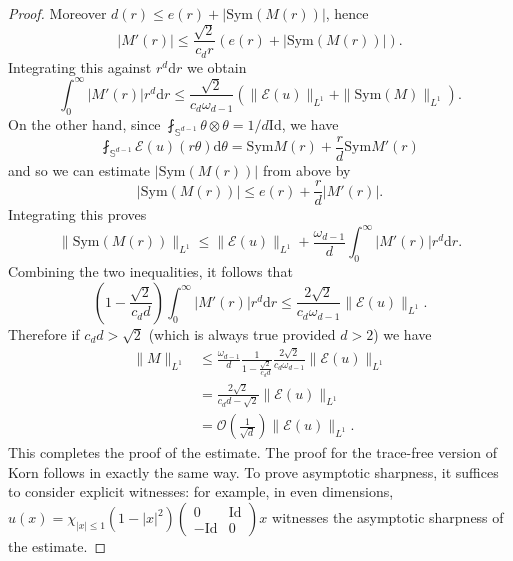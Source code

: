 \documentclass[11pt, a4paper]{amsart}
\theoremstyle{definition}
\theoremstyle{remark}
\begin{document}
\begin{proof}
Moreover $d(r)\le e(r)+|\mathrm{Sym}(M(r))|$, hence
\begin{equation*}
    |M'(r)|\le \frac{\sqrt 2}{c_d r}
    \left(e(r)+|\mathrm{Sym}(M(r))|\right).
\end{equation*}
Integrating this against $r^d\mathrm{d}r$ we obtain
\begin{equation*}
    \int_0^\infty |M'(r)|r^d\mathrm{d}r
    \le \frac{\sqrt 2}{c_d \omega_{d-1}}
    (\|\mathcal E(u)\|_{L^1}+\|\mathrm{Sym}(M)\|_{L^1}).
\end{equation*}
On the other hand, since $\fint_{\mathbb{S}^{d-1}}
\theta\otimes \theta=1/d \mathrm{Id}$, we have
\begin{equation*}
    \fint_{\mathbb S^{d-1}} \mathcal E(u)(r\theta)
    \mathrm d \theta
    =\mathrm{Sym} M(r)+\frac rd\mathrm{Sym} M'(r)
\end{equation*}
and so we can estimate
$|\mathrm{Sym}(M(r))|$ from above by 
\begin{equation*}
    |\mathrm{Sym}(M(r))|\le e(r)+\frac{r}{d}|M'(r)|.
\end{equation*}
Integrating this proves
\begin{equation*}
    \|\mathrm{Sym}(M(r))\|_{L^1}
    \le \|\mathcal E(u)\|_{L^1}+
    \frac{\omega_{d-1}}d \int_0^\infty
    |M'(r)|r^d\mathrm{d}r.
\end{equation*}
Combining the two inequalities, it follows that
\begin{equation*}
\left(1-\frac{\sqrt 2}
{c_d d}\right)\int_0^\infty |M'(r)|r^{d}\mathrm{d}r
\le \frac{2\sqrt 2}{c_d\omega_{d-1}}
\|\mathcal E(u)\|_{L^1}. 
\end{equation*}
Therefore if $c_d d>\sqrt 2$
(which is always true provided $d>2$) we have
\begin{align*}
    \|M\|_{L^1}&\le \frac{\omega_{d-1}}d
    \frac{1}{1-\frac{\sqrt 2}{c_d d}}
    \frac{2\sqrt 2}{c_d\omega_{d-1}}
    \|\mathcal E(u)\|_{L^1}
    \\&=\frac{2\sqrt 2}
    {c_dd-\sqrt 2}\|\mathcal E(u)\|_{L^1}\\
    &=\mathcal O\left(\frac{1}{\sqrt d}\right)
    \|\mathcal E(u)\|_{L^1}.
\end{align*}
This completes the proof of the estimate.
The proof for the trace-free
version of Korn follows in exactly the same way.
To prove asymptotic sharpness, it suffices to consider 
explicit witnesses: for example, in even dimensions,
$u(x)=\chi_{|x|\le 1}(1-|x|^2)
\begin{pmatrix}
0&\mathrm{Id}\\ -\mathrm{Id}&0
\end{pmatrix}x$
witnesses the asymptotic sharpness of the estimate.
\end{proof}
\end{document}
